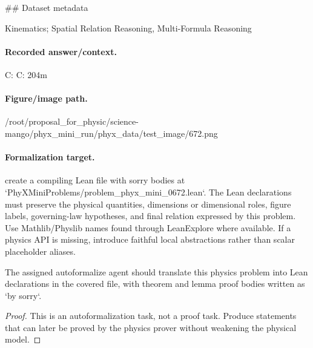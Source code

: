 \#\# Dataset metadata

Kinematics; Spatial Relation Reasoning, Multi-Formula Reasoning

\paragraph{Recorded answer/context.}
C: C: 204m

\paragraph{Figure/image path.}
/root/proposal\_for\_physic/science-mango/phyx\_mini\_run/phyx\_data/test\_image/672.png

\paragraph{Formalization target.}
create a compiling Lean file with sorry bodies at `PhyXMiniProblems/problem\_phyx\_mini\_0672.lean`. The Lean declarations must preserve the physical quantities, dimensions or dimensional roles, figure labels, governing-law hypotheses, and final relation expressed by this problem.
Use Mathlib/Physlib names found through LeanExplore where available. If a physics API is missing, introduce faithful local abstractions rather than scalar placeholder aliases.

\begin{theorem}
\label{thm:physics:phyx_mini_0672:target}
The assigned autoformalize agent should translate this physics problem into Lean declarations in the covered file, with theorem and lemma proof bodies written as `by sorry`.
\end{theorem}
\begin{proof}
This is an autoformalization task, not a proof task. Produce statements that can later be proved by the physics prover without weakening the physical model.
\end{proof}

